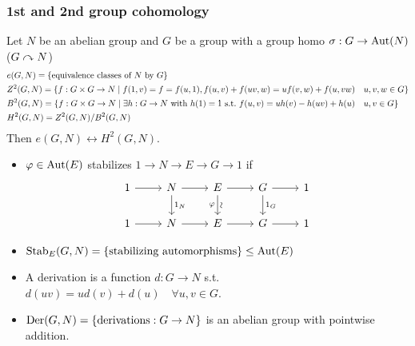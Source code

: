 \subsubsection{1st and 2nd group cohomology}
Let $N$ be an abelian group and $G$ be a group with a group homo
$\sigma: G \to \operatorname{Aut}(N)$ ($G \curvearrowright N$)
\begin{align*}
  & e(G, N) = \{ \text{equivalence classes of $N$ by $G$} \} \\
  & Z^2(G, N) = \{
    f: G\times G \to N \mid f(1, v) = f = f(u, 1),
    f(u, v) + f(uv, w) = uf(v, w) + f(u, vw) \quad u, v, w \in G \} \\
  & B^2(G, N) = \{
    f: G\times G \to N \mid \exists h: G\to N \text{~with~} h(1) = 1
    \text{~s.t.~}
  f(u, v) = uh(v) - h(uv) + h(u) \quad u, v \in G \} \\
  & H^2(G, N) = {Z^2(G, N)}/{B^2(G, N)}
\end{align*}
Then $e(G, N) \leftrightarrow H^2(G, N)$.

\begin{definition} \mbox{}
  \begin{itemize}
    \item $\varphi \in \operatorname{Aut}(E)$ stabilizes $1\to N\to E\to G\to 1$ if
      \[
        \begin{tikzcd}
          1 \arrow[r]
          & N \arrow[d, "1_N"] \arrow[r]
          & E \arrow[d, "\rotatebox{90}{\(\sim\)}", "\varphi"'] \arrow[r]
          & G \arrow[d, "1_G"] \arrow[r]
          & 1 \\
          1 \arrow[r] & N \arrow[r] & E \arrow[r] & G \arrow[r] & 1
        \end{tikzcd}
      \]
    \item $\operatorname{Stab}_E(G, N) = \{ \text{stabilizing automorphisms} \} \le \operatorname{Aut}(E)$
  \end{itemize}
\end{definition}

\begin{definition} \mbox{}
  \begin{itemize}
    \item A derivation is a function $d: G\to N$ s.t. $d(uv) = ud(v) + d(u)
      \quad \forall u, v \in G$.
    \item $\operatorname{Der}(G, N) = \{ \text{derivations} : G\to N \}$ is an abelian group
      with pointwise addition.
  \end{itemize}
\end{definition}


